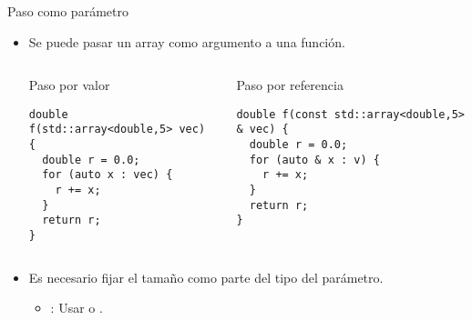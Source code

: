 \begin{frame}[t,fragile]{Paso como parámetro}
\begin{itemize}
  \item Se puede pasar un array como argumento a una función.

  \begin{columns}[T]

\begin{block}{Paso por valor}
\begin{lstlisting}
double f(std::array<double,5> vec) {
  double r = 0.0;
  for (auto x : vec) {
    r += x;
  }
  return r;
}
\end{lstlisting}
\end{block}

\begin{block}{Paso por referencia}
\begin{lstlisting}
double f(const std::array<double,5> & vec) {
  double r = 0.0;
  for (auto & x : v) {
    r += x;
  }
  return r;
}
\end{lstlisting}
\end{block}
  \end{columns}

  \item Es necesario fijar el tamaño como parte del tipo del parámetro.
    \begin{itemize}
      \item {}: Usar  o 
            .
    \end{itemize}

\end{itemize}
\end{frame}
